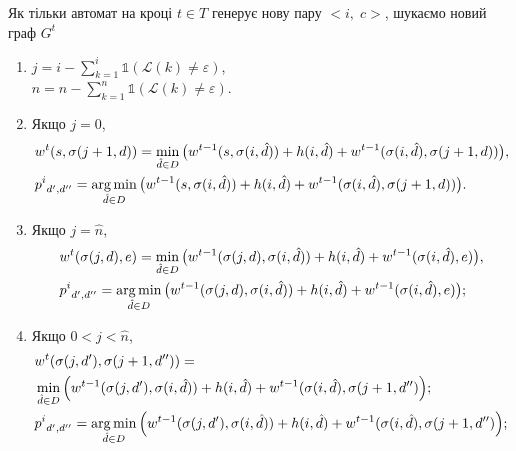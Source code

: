 Як тільки автомат на кроці $ t \in T $ генерує нову пару $<i, \;c>$, шукаємо новий граф $G^t$
\begin{enumerate}
	\item
		$ j = i - \sum\limits_{k = 1}^{i}{ \mathds{1}(\mathcal{L}(k) \neq \varepsilon ) } $,\\
		$ \hat{n} = n - \sum\limits_{k = 1}^{n}{ \mathds{1}(\mathcal{L}(k) \neq \varepsilon ) } $.\\
	\item 
		Якщо $ j = 0$,
		\begin{align}
		&w^t(s, \sigma(j+1, d)) = \min\limits_{\hat{d} \in D} \big( w^{t-1}(s, \sigma(i,\hat{d})) + h(i, \hat{d}) +  w^{t-1}(\sigma(i, \hat{d}), \sigma(j+1,d)) \big),\\
		&{p^i}_{d',d''} = \operatorname*{arg\,min}\limits_{\hat{d} \in D} \big( w^{t-1}(s, \sigma(i,\hat{d})) + h(i, \hat{d}) +  w^{t-1}(\sigma(i, \hat{d}), \sigma(j+1,d)) \big). 
		\end{align}
		
	\item 
		Якщо $ j = \hat{n}$,
		\begin{align}
		& w^t(\sigma(j, d) , e ) = \min\limits_{\hat{d} \in D} \big( w^{t-1}(\sigma(j, d), \sigma(i,\hat{d})) + h(i, \hat{d}) +  w^{t-1}(\sigma(i, \hat{d}), e) \big),  \\
		& {p^i}_{d',d''} = \operatorname*{arg\,min}\limits_{\hat{d} \in D} \big( w^{t-1}(\sigma(j, d), \sigma(i,\hat{d})) + h(i, \hat{d}) +  w^{t-1}(\sigma(i, \hat{d}), e) \big);
		\end{align}
		
	\item 
		Якщо $ 0 < j < \hat{n}$,
		\begin{align}
		& w^t(\sigma(j, d') , \sigma(j+1, d'') ) = \\
		&\min\limits_{\hat{d} \in D} \Big( w^{t-1}(\sigma(j, d'), \sigma(i,\hat{d})) + h(i, \hat{d}) +  w^{t-1}(\sigma(i, \hat{d}), \sigma(j+1, d'') \Big);\\
		&{p^i}_{d',d''} = \operatorname*{arg\,min}\limits_{\hat{d} \in D} \Big( w^{t-1}(\sigma(j, d'), \sigma(i,\hat{d})) +  h(i, \hat{d}) +  w^{t-1}(\sigma(i, \hat{d}), \sigma(j+1, d'') \Big);
		\end{align}
		

\end{enumerate}
